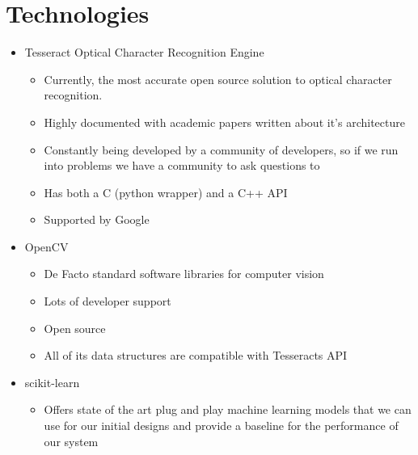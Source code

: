 	\section{Technologies}
		\begin{itemize}
			\item Tesseract Optical Character Recognition Engine
			\begin{itemize}
				\item Currently, the most accurate open source solution to optical character recognition.
				\item Highly documented with academic papers written about it’s architecture
				\item Constantly being developed by a community of developers, so if we run into problems we have a community to ask questions to
				\item Has both a C (python wrapper) and a C++ API
				\item Supported by Google
			\end{itemize}

			\item OpenCV
			\begin{itemize}
				\item De Facto standard software libraries for computer vision
				\item Lots of developer support
				\item Open source
				\item All of its data structures are compatible with Tesseracts API
			\end{itemize}

%
\pagebreak
			\item scikit-learn
			\begin{itemize}
				\item Offers state of the art plug and play machine learning models that we can use for our initial designs and provide a baseline for the performance of our system 
			\end{itemize}
		\end{itemize}